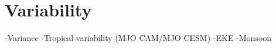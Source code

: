 \section{Variability}
\label{sec:variability}
-Variance
-Tropical variability (MJO CAM/MJO CESM)
-EKE
-Monsoon
